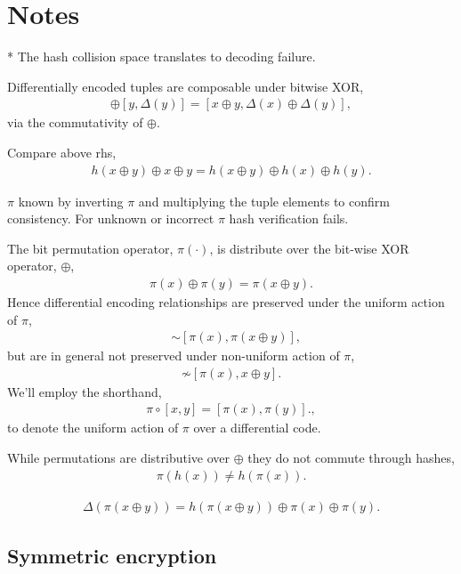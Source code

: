 \documentclass[twocolumn, aps, amsmath, amssymb, nofootinbib, superscriptaddress, longbibliography, doublefloatfix, table-of-contents, eqsecnum, rmp]{revtex4-2}
\begin{document}
\section{Notes}

* The hash collision space translates to decoding failure.

Differentially encoded tuples are composable under bitwise XOR,
\begin{align}
	[x,\Delta(x)] \oplus [y,\Delta(y)] = [x\oplus y, \Delta(x)\oplus \Delta(y)],
\end{align}
via the commutativity of $\oplus$.

Compare above rhs,
\begin{align}
	h(x\oplus y) \oplus x \oplus y = h(x \oplus y) \oplus h(x) \oplus h(y).
\end{align}

$\pi$ known by inverting $\pi$ and multiplying the tuple elements to confirm consistency. For unknown or incorrect $\pi$ hash verification fails.

The bit permutation operator, $\pi(\cdot)$, is distribute over the bit-wise XOR operator, $\oplus$,
\begin{align}
	\pi(x)\oplus \pi(y) = \pi(x\oplus y).
\end{align}
Hence differential encoding relationships are preserved under the uniform action of $\pi$,
\begin{align}
	[x,x\oplus y] &\sim [\pi(x), \pi(x\oplus y)],
\end{align}
but are in general not preserved under non-uniform action of $\pi$,
\begin{align}
	[x,x\oplus y] \not\sim [\pi(x), x\oplus y].
\end{align}
We'll employ the shorthand,
\begin{align}
	\pi\circ[x,y] = [\pi(x),\pi(y)].,
\end{align}
to denote the uniform action of $\pi$ over a differential code.

While permutations are distributive over $\oplus$ they do not commute through hashes,
\begin{align}
	\pi(h(x)) \neq h(\pi(x)).	
\end{align}

\begin{align}
	\Delta(\pi(x\oplus y)) = h(\pi(x\oplus y)) \oplus \pi(x) \oplus \pi(y).
\end{align}

\subsection{Symmetric encryption}
\end{document}
